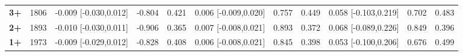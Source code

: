 \documentclass[authordate, empirical]{jote-new-article}
\begin{document}
\begin{table}[h!]
\begin{fullwidth}
{\begin{tabular}{@{} l l l l l l l l l l l @{}}
        \textbf{3+}                                       & 1806       & -0.009 [-0.030,0.012]                           & -0.804               & 0.421    & 0.006 [-0.009,0.020]
                                                          & 0.757      & 0.449                                           & 0.058 [-0.103,0.219] & 0.702    & 0.483                                 \\

        \textbf{2+}                                       & 1893       & -0.010 [-0.030,0.011]                           & -0.906               & 0.365    & 0.007 [-0.008,0.021]
                                                          & 0.893      & 0.372                                           & 0.068 [-0.089,0.226] & 0.849    & 0.396                                 \\

        \textbf{1+}                                       & 1973       & -0.009 [-0.029,0.012]                           & -0.828               & 0.408    & 0.006 [-0.008,0.021]
                                                          & 0.845      & 0.398                                           & 0.053 [-0.100,0.206] & 0.676    & 0.499                                 \\
      \end{tabular}}
  \end{fullwidth}
\end{table}
\end{document}
